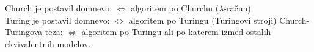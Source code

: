 \documentclass[10pt,a4paper,oneside]{book}
\begin{document}
\Neurejeno

Church je postavil domnevo:  $\Longleftrightarrow$ algoritem po Churchu ($\lambda$-račun)\\%
Turing je postavil domnevo:  $\Longleftrightarrow$ algoritem po Turingu (Turingovi stroji)
\br
Church-Turingova teza:  $\Longleftrightarrow$ algoritem po Turingu ali po katerem izmed ostalih ekvivalentnih modelov.%

\end{document}

